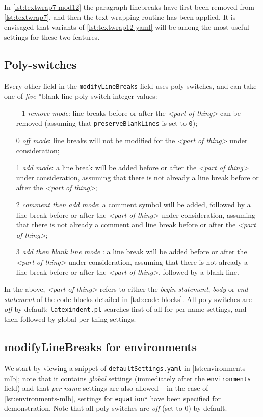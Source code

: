 	In \cref{lst:textwrap7-mod12} the paragraph linebreaks have first been removed from
	\cref{lst:textwrap7}, and  then the text wrapping routine has been applied. It is
	envisaged that variants of \cref{lst:textwrap12-yaml} will be among the most useful
	settings for these two features.

\subsection{Poly-switches}\label{sec:poly-switches}
	Every other field in the \texttt{modifyLineBreaks} field uses poly-switches, and can
	take one of \emph{five}%
	*{blank line poly-switch} integer values:
	\begin{itemize}[font=\bfseries]
		\item[$-1$] \emph{remove mode}: line breaks before or after the
		      \emph{<part of thing>} can be removed (assuming that \texttt{preserveBlankLines} is
		      set to \texttt{0});
		\item[0] \emph{off mode}: line breaks will not be modified for the
		      \emph{<part of thing>} under consideration;
		\item[1] \emph{add mode}: a line break will be added before or after the
		      \emph{<part of thing>} under consideration, assuming that
		      there is not already a line break before or after the \emph{<part of thing>};
		\item[2] \emph{comment then add mode}: a comment symbol will be added, followed by a line break
		      before or after the \emph{<part of thing>} under consideration, assuming that there
		      is not already a comment and line break before or after the \emph{<part of thing>};
		\item[3] \emph{add then blank line mode}%
		      : a line break will be added before or after the
		      \emph{<part of thing>} under consideration, assuming that
		      there is not already a line break before or after the \emph{<part of thing>},
		      followed by a blank line.
	\end{itemize}
	In the above, \emph{<part of thing>} refers to either the
	\emph{begin statement}, \emph{body} or \emph{end statement}
	of the code blocks detailed in \vref{tab:code-blocks}. All poly-switches are
	\emph{off} by default; \texttt{latexindent.pl} searches first of all
	for per-name settings, and then followed by global per-thing settings.

\subsection{modifyLineBreaks for environments}\label{sec:modifylinebreaks-environments}
	We start by viewing a snippet of \texttt{defaultSettings.yaml} in
	\cref{lst:environments-mlb}; note that it contains \emph{global} settings
	(immediately after the \texttt{environments} field) and that
	\emph{per-name} settings are also allowed -- in the case of
	\cref{lst:environments-mlb}, settings for \texttt{equation*} have been
    specified for demonstration. Note that all poly-switches are \emph{off} (set to 0) by default.

